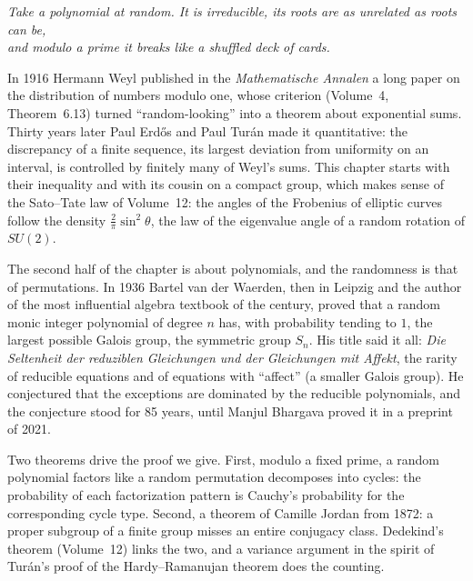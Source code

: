 \begin{center}\itshape
Take a polynomial at random. It is irreducible, its roots are as unrelated as roots can be,\\
and modulo a prime it breaks like a shuffled deck of cards.
\end{center}

In 1916 Hermann Weyl published in the \emph{Mathematische Annalen} a long paper on the distribution of numbers modulo one, whose criterion (Volume~4, Theorem~6.13) turned ``random-looking'' into a theorem about exponential sums. Thirty years later Paul Erd\H{o}s and Paul Turán made it quantitative: the discrepancy of a finite sequence, its largest deviation from uniformity on an interval, is controlled by finitely many of Weyl's sums. This chapter starts with their inequality and with its cousin on a compact group, which makes sense of the Sato--Tate law of Volume~12: the angles of the Frobenius of elliptic curves follow the density $\frac2\pi\sin^2\theta$, the law of the eigenvalue angle of a random rotation of $SU(2)$.

The second half of the chapter is about polynomials, and the randomness is that of permutations. In 1936 Bartel van der Waerden, then in Leipzig and the author of the most influential algebra textbook of the century, proved that a random monic integer polynomial of degree $n$ has, with probability tending to $1$, the largest possible Galois group, the symmetric group $S_n$. His title said it all: \emph{Die Seltenheit der reduziblen Gleichungen und der Gleichungen mit Affekt}, the rarity of reducible equations and of equations with ``affect'' (a smaller Galois group). He conjectured that the exceptions are dominated by the reducible polynomials, and the conjecture stood for 85 years, until Manjul Bhargava proved it in a preprint of 2021.

Two theorems drive the proof we give. First, modulo a fixed prime, a random polynomial factors like a random permutation decomposes into cycles: the probability of each factorization pattern is Cauchy's probability for the corresponding cycle type. Second, a theorem of Camille Jordan from 1872: a proper subgroup of a finite group misses an entire conjugacy class. Dedekind's theorem (Volume~12) links the two, and a variance argument in the spirit of Turán's proof of the Hardy--Ramanujan theorem does the counting.

